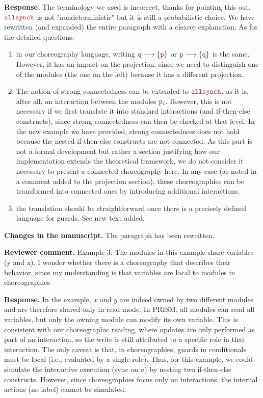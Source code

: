 \documentclass[11pt]{article}
\newcommand{\role}[1]{\textcolor{bloodyred}{\mathtt{#1}}}
\newcommand{\nr}{\role p}
\newcommand{\nrr}{\role q}
\newcommand{\allsynchName}{\textcolor{bloodyred}{\mathtt{allsynch}}}
\newcommand{\revcomment}[1]{%
  \begin{reviewercomment}
  \textbf{Reviewer comment.} #1
  \end{reviewercomment}
}
\newcommand{\revresponse}[2][]{%
  \par\noindent\textbf{Response.} #1 #2
}
\newcommand{\revchanges}[2][]{%
  \par\noindent\textbf{Changes in the manuscript.} #1
  #2\par\bigskip
}
\begin{document}
\revresponse{The terminology we used is incorrect, thanks for pointing
  this out.  $\allsynchName$ is not "nondeterministic" but it is still
  a probabilistic choice. We have rewritten (and expanded) the entire
  paragraph with a clearer explanation. As for the detailed questions:
  \begin{enumerate}
    
  \item in our choreography language, writing
    $\nrr\longrightarrow\{\nr\}$ or $\nr\longrightarrow\{\nrr\}$ is
    the same. However, it has an impact on the projection, since we
    need to distinguish one of the modules (the one on the left)
    because it has a different projection.
    
  \item The notion of strong connectedness can be extended to
    $\allsynchName$, as it is, after all, an interaction between the
    modules $\nr_i$. However, this is not necessary if we first
    translate it into standard interactions (and if-then-else
    constructs), since strong connectedness can then be checked at
    that level. In the new example we have provided, strong
    connectedness does not hold because the nested if-then-else
    constructs are not connected. As this part is not a formal
    development but rather a section justifying how our implementation
    extends the theoretical framework, we do not consider it necessary
    to present a connected choreography here. In any case (as noted in
    a comment added to the projection section), these choreographies
    can be transformed into connected ones by introducing additional
    interactions.

    
  \item the translation should be straightforward once there is a
    precisely defined language for guards. See new text added. 
 \end{enumerate}
}

\revchanges{ The paragraph has been rewritten.  }


\revcomment{
Example 3: The modules in this example share variables (y and x). I wonder whether there is a choreography that describes their behavior, since my understanding is that variables are local to modules in choreographies
}

\revresponse{
In the example, $x$ and $y$ are indeed owned by two different modules and are therefore shared only in read mode. In PRISM, all modules can read all variables, but only the owning module can modify its own variable. This is consistent with our choreographic reading, where updates are only performed as part of an interaction, so the write is still attributed to a specific role in that interaction. The only caveat is that, in choreographies, guards in conditionals must be local (i.e., evaluated by a single role). Thus, for this example, we could simulate the interactive execution (sync on $a$) by nesting two if-then-else constructs. However, since choreographies focus only on interactions, the internal actions (no label) cannot be simulated.
}
\end{document}
